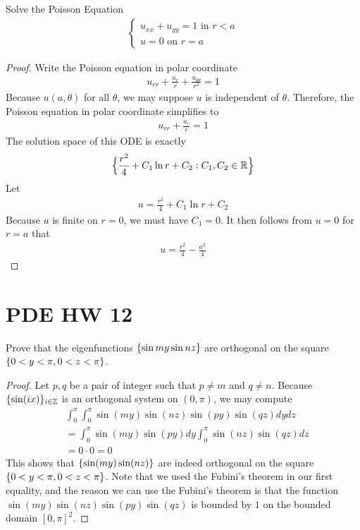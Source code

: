 \documentclass{report}
\begin{document}
\begin{question}{}{}
Solve the Poisson Equation
\begin{align*}
\begin{cases}
  u_{xx}+ u_{yy}=1 \text{ in }r<a \\
  u=0\text{ on }r=a
\end{cases}
\end{align*}
\end{question}
\begin{proof}
Write the Poisson equation in polar coordinate 
\begin{align*}
u_{rr}+ \frac{u_r}{r} + \frac{u_{\theta \theta}}{r^2}=1
\end{align*}
Because $u(a, \theta)$ for all $\theta$, we may suppose $u$ is independent of  $\theta$. Therefore, the Poisson equation in polar coordinate simplifies to 
\begin{align*}
u_{rr} + \frac{u_r}{r} = 1
\end{align*}
The solution space of this ODE is exactly  
\begin{align*}
\Big\{  \frac{r^2}{4}+ C_1 \ln r+ C_2 : C_1, C_2 \in\mathbb{R} \Big\}
\end{align*}
Let 
\begin{align*}
u= \frac{r^2}{4}+ C_1 \ln r + C_2
\end{align*}
Because $u$ is finite on $r=0$, we must have  $C_1=0$. It then follows from  $u=0$ for  $r=a$ that   
\begin{align*}
u= \frac{r^2}{4}- \frac{a^2}{4}
\end{align*}
\end{proof}
\section{PDE HW 12}
\begin{question}{}{}
Prove that the eigenfunctions $\{ \sin my \sin nz \}$ are orthogonal on the square $\{ 0<y<\pi  , 0 <z<\pi  \}$. 
\end{question}
\begin{proof}
Let $p,q$ be a pair of integer such that $p\neq m$ and $q\neq n$. Because $\{ \sin (ix) \}_{i\in\mathbb{Z}}$ is an orthogonal system on $(0,\pi )$, we may compute 
\begin{align*}
&\int_0^{\pi }\int_0^{\pi } \sin (my)\sin (nz) \sin (py)\sin (qz)dydz \\
&= \int_0^{\pi } \sin (my)\sin (py)dy \int_0^{\pi } \sin (nz)\sin (qz)dz \\
&=0 \cdot 0=0 
\end{align*}
This shows that $\{ \sin (my) \sin (nz) \}$ are indeed orthogonal on the square $\{ 0<y<\pi ,0<z<\pi  \}$. Note that we used the Fubini's theorem in our first equality, and the reason we can use the Fubini's theorem is that the function $\sin (my)\sin (nz)\sin (py)\sin (qz)$ is bounded by $1$ on the bounded domain  $[0,\pi ]^2$. 
\end{proof}
\end{document}
